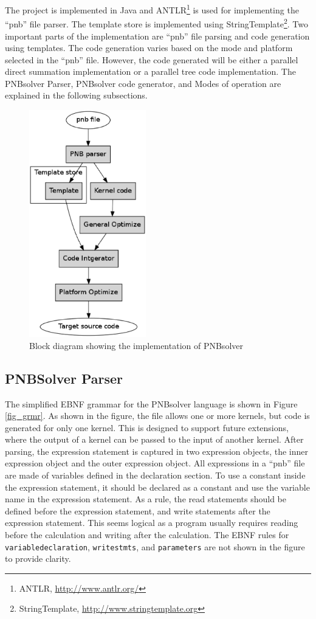 \documentclass[draftclsnofoot]{elsarticle}
\begin{document}
The project is implemented in Java and ANTLR\footnote{ANTLR, \url{http://www.antlr.org/}} is used for implementing the ``pnb'' file parser. The template store is implemented using
StringTemplate\footnote{StringTemplate, \url{http://www.stringtemplate.org}}. Two important parts of the implementation are ``pnb'' file parsing and code generation using 
templates. The code generation varies based on the mode and platform selected in the ``pnb'' file. However, the code generated will be either a parallel direct summation implementation or a
parallel tree code implementation. The PNBsolver Parser,  PNBsolver code generator, and Modes of operation  are explained in the following subsections. 


\begin{figure}[!t]
\centering
\includegraphics[width=2.0in]{block.eps}
\caption{Block diagram showing the implementation of PNBsolver}
\label{fig_block}
\end{figure}

\subsection{PNBSolver Parser}

The simplified EBNF grammar for the PNBsolver language is shown in Figure \ref{fig_grmr}. 
As shown in the figure, the file allows one or more kernels, but code is generated for only one kernel.
This is designed to support future extensions, where the output of a kernel can be passed to the input of another kernel. After parsing, the expression statement is captured in two
expression objects, the inner expression object and the outer expression object. All expressions in a ``pnb'' file are made of variables defined in the declaration section. To use a constant
inside the expression statement, it should be declared as a constant and use the variable name in the expression statement. As a rule, the read statements should be defined before
the expression statement, and write statements after the expression statement. This seems logical as a program usually requires reading before the calculation and writing after the
 calculation. The EBNF rules for \texttt{variabledeclaration}, \texttt{writestmts}, and \texttt{parameters} are not shown in the figure to provide clarity. 
 
\end{document}
